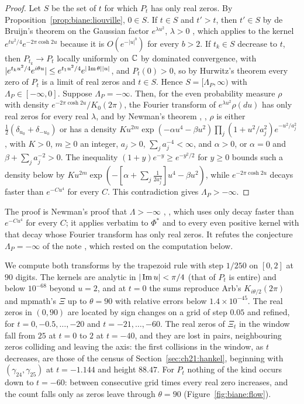 \begin{proof}
Let $S$ be the set of $t$ for which $P_t$ has only real zeros. By Proposition~\ref{prop:biane:liouville}, $0\in S$. If $t\in S$ and $t'>t$, then $t'\in S$ by de Bruijn's theorem on the Gaussian factor $e^{\lambda u^2}$, $\lambda>0$ \cite[Theorem~13]{deBruijn}, which applies to the kernel $e^{tu^2/4}e^{-2\pi\cosh2u}$ because it is $O(e^{-|u|^b})$ for every $b>2$. If $t_k\in S$ decrease to $t$, then $P_{t_k}\to P_t$ locally uniformly on $\mathbb{C}$ by dominated convergence, with $|e^{t_ku^2/4}e^{i\theta u}|\le e^{t_1u^2/4}e^{|\operatorname{Im}\theta||u|}$, and $P_t(0)>0$, so by Hurwitz's theorem every zero of $P_t$ is a limit of real zeros and $t\in S$. Hence $S=[\Lambda_P,\infty)$ with $\Lambda_P\in[-\infty,0]$. Suppose $\Lambda_P=-\infty$. Then, for the even probability measure $\rho$ with density $e^{-2\pi\cosh2u}/K_0(2\pi)$, the Fourier transform of $e^{\lambda u^2}\rho(du)$ has only real zeros for every real $\lambda$, and by Newman's theorem \cite{Newman1976}, \cite[Theorem 10]{NewmanWu20}, $\rho$ is either $\frac12(\delta_{u_0}+\delta_{-u_0})$ or has a density $Ku^{2m}\exp(-\alpha u^4-\beta u^2)\prod_j(1+u^2/a_j^2)e^{-u^2/a_j^2}$, with $K>0$, $m\ge0$ an integer, $a_j>0$, $\sum_ja_j^{-4}<\infty$, and $\alpha>0$, or $\alpha=0$ and $\beta+\sum_ja_j^{-2}>0$. The inequality $(1+y)e^{-y}\ge e^{-y^2/2}$ for $y\ge0$ bounds such a density below by $Ku^{2m}\exp(-[\alpha+\sum_j\frac1{2a_j^4}]u^4-\beta u^2)$, while $e^{-2\pi\cosh2u}$ decays faster than $e^{-Cu^4}$ for every $C$. This contradiction gives $\Lambda_P>-\infty$.
\end{proof}

The proof is Newman's proof that $\Lambda>-\infty$ \cite{Newman1976}, \cite[Theorem~9]{NewmanWu20}, which uses only decay faster than $e^{-Cu^4}$ for every $C$; it applies verbatim to $\Phi^*$ and to every even positive kernel with that decay whose Fourier transform has only real zeros. It refutes the conjecture $\Lambda_P=-\infty$ of the note \cite{P26bia}, which rested on the computation below.

We compute both transforms by the trapezoid rule with step $1/250$ on $[0,2]$ at $90$ digits. The kernels are analytic in $|\operatorname{Im} u|<\pi/4$ (that of $P_t$ is entire) and below $10^{-68}$ beyond $u=2$, and at $t=0$ the sums reproduce Arb's $K_{i\theta/2}(2\pi)$ and mpmath's $\Xi$ up to $\theta=90$ with relative errors below $1.4\times10^{-45}$. The real zeros in $(0,90)$ are located by sign changes on a grid of step $0.05$ and refined, for $t=0,-0.5,\dots,-20$ and $t=-21,\dots,-60$. The real zeros of $\Xi_t$ in the window fall from $25$ at $t=0$ to $2$ at $t=-40$, and they are lost in pairs, neighbouring zeros colliding and leaving the axis: the first collisions in the window, as $t$ decreases, are those of the census of Section~\ref{sec:ch21:hankel}, beginning with $(\gamma_{24},\gamma_{25})$ at $t=-1.144$ and height $88.47$. For $P_t$ nothing of the kind occurs down to $t=-60$: between consecutive grid times every real zero increases, and the count falls only as zeros leave through $\theta=90$ (Figure~\ref{fig:biane:flow}).

